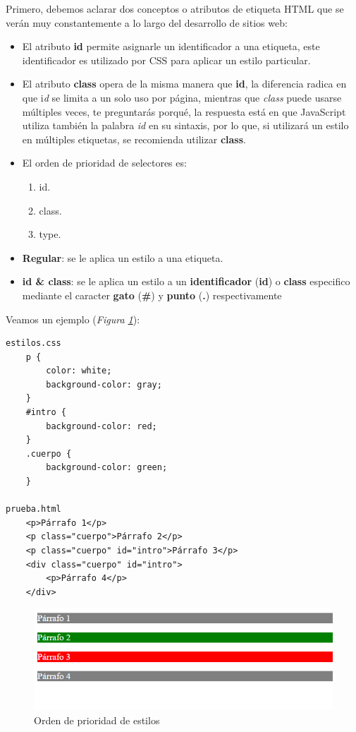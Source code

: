 Primero, debemos aclarar dos conceptos o atributos de etiqueta HTML que se verán muy constantemente a lo largo del desarrollo de sitios web:
\begin{itemize}
    \item El atributo \textbf{id} permite asignarle un identificador a una etiqueta, este identificador es utilizado por CSS para aplicar un estilo particular.
    \item El atributo \textbf{class} opera de la misma manera que \textbf{id}, la diferencia radica en que i\textit{d} se limita a un solo uso por página, mientras que \textit{class} puede usarse múltiples veces, te preguntarás porqué, la respuesta está en que JavaScript utiliza también la palabra \textit{id} en su sintaxis, por lo que, si utilizará un estilo en múltiples etiquetas, se recomienda utilizar \textbf{class}.
    \item El orden de prioridad de selectores es:
    \begin{enumerate}
        \item id.
        \item class.
        \item type.
    \end{enumerate}
\end{itemize}
\begin{itemize}
    \item \textbf{Regular}: se le aplica un estilo a una etiqueta.
    \item \textbf{id \& class}: se le aplica un estilo a un \textbf{identificador} (\textbf{id}) o \textbf{class} especifico mediante el caracter \textbf{gato} (\textbf{\#}) y \textbf{punto} (\textbf{.}) respectivamente
\end{itemize}

Veamos un ejemplo (\textit{Figura \ref{fig: 1}}):
\begin{lstlisting}
estilos.css
    p {
        color: white;
        background-color: gray;
    }
    #intro {
        background-color: red;
    }
    .cuerpo {
        background-color: green;
    }

prueba.html
    <p>Párrafo 1</p>
    <p class="cuerpo">Párrafo 2</p>
    <p class="cuerpo" id="intro">Párrafo 3</p>
    <div class="cuerpo" id="intro">
        <p>Párrafo 4</p>
    </div>
\end{lstlisting}
\begin{figure}[H]
    \begin{center}
        \caption{Orden de prioridad de estilos}
        \label{fig: 1}
        \includegraphics[width=12cm]{ss/tipos de estilos.png}
    \end{center}
\end{figure}

